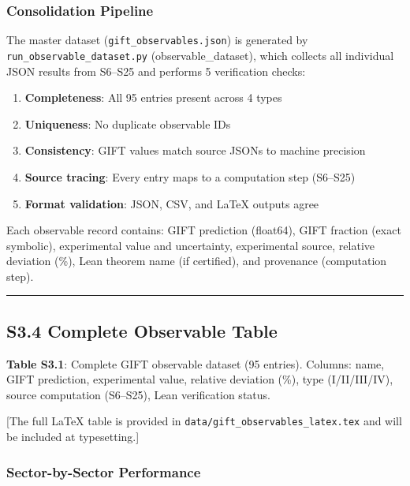 \documentclass[11pt,a4paper]{article}
\begin{document}
{{{\subsubsection{Consolidation Pipeline}\label{consolidation-pipeline}

The master dataset (\texttt{gift\_observables.json}) is generated by \texttt{run\_observable\_dataset.py} (observable\_dataset), which collects all individual JSON results from S6--S25 and performs 5 verification checks:

\begin{enumerate}


\item
  \textbf{Completeness}: All 95 entries present across 4 types
\item
  \textbf{Uniqueness}: No duplicate observable IDs
\item
  \textbf{Consistency}: GIFT values match source JSONs to machine precision
\item
  \textbf{Source tracing}: Every entry maps to a computation step (S6--S25)
\item
  \textbf{Format validation}: JSON, CSV, and LaTeX outputs agree
\end{enumerate}

Each observable record contains: GIFT prediction (float64), GIFT fraction (exact symbolic), experimental value and uncertainty, experimental source, relative deviation (\%), Lean theorem name (if certified), and provenance (computation step).

\begin{center}\rule{0.5\linewidth}{0.5pt}\end{center}

\subsection{S3.4 Complete Observable Table}\label{s3.4-complete-observable-table}

\textbf{Table S3.1}: Complete GIFT observable dataset (95 entries). Columns: name, GIFT prediction, experimental value, relative deviation (\%), type (I/II/III/IV), source computation (S6--S25), Lean verification status.

{[}The full LaTeX table is provided in \texttt{data/gift\_observables\_latex.tex} and will be included at typesetting.{]}

\subsubsection{Sector-by-Sector Performance}\label{sector-by-sector-performance}

}}}
\end{document}
